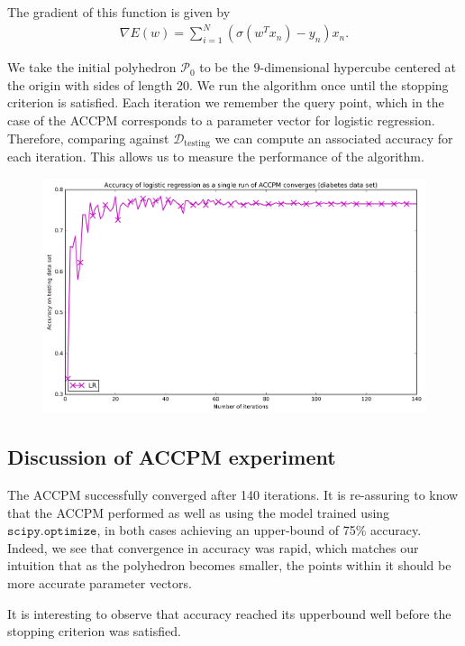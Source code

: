 \documentclass[11pt]{amsart}
\theoremstyle{definition}
\theoremstyle{remark}
\newcommand{\transpose}{T}
\begin{document}
        The gradient of this function is given by
        \begin{align*}
          \nabla E(w) = \sum_{i=1}^{N} (\sigma(w^\transpose x_n) - y_n)x_n.
        \end{align*}

        We take the initial polyhedron $\mathcal{P}_0$ to be the $9$-dimensional hypercube centered at the origin with sides of length 20. We run the algorithm once until the stopping criterion is satisfied. Each iteration we remember the query point, which in the case of the ACCPM corresponds to a parameter vector for logistic regression. Therefore, comparing against $\mathcal{D}_\text{testing}$ we can compute an associated accuracy for each iteration. This allows us to measure the performance of the algorithm.
        \FloatBarrier
        \begin{figure}[h]
            \includegraphics[width=\linewidth]{figures/accpm_experiment.png}
        \end{figure}  
        \FloatBarrier

    \subsection{Discussion of ACCPM experiment}
        The ACCPM successfully converged after 140 iterations. It is re-assuring to know that the ACCPM performed as well as using the model trained using $\texttt{scipy.optimize}$, in both cases achieving an upper-bound of 75\% accuracy. Indeed, we see that convergence in accuracy was rapid, which matches our intuition that as the polyhedron becomes smaller, the points within it should be more accurate parameter vectors. 

        It is interesting to observe that accuracy reached its upperbound well before the stopping criterion was satisfied.
\end{document}
